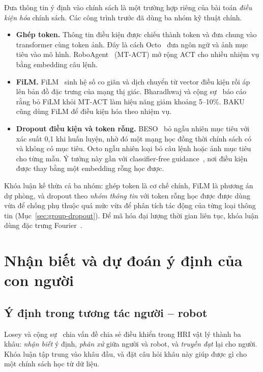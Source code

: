 Đưa thông tin ý định vào chính sách là một trường hợp riêng của bài toán \emph{điều kiện hóa} chính sách. Các công trình trước đã dùng ba nhóm kỹ thuật chính.
\begin{itemize}
  \item \textbf{Ghép token.} Thông tin điều kiện được chiếu thành token và đưa chung vào transformer cùng token ảnh. Đây là cách Octo~\cite{octo2024} đưa ngôn ngữ và ảnh mục tiêu vào mô hình. RoboAgent~\cite{bharadhwaj2024roboagent} (MT-ACT) mở rộng ACT cho nhiều nhiệm vụ bằng embedding câu lệnh.
  \item \textbf{FiLM.} FiLM~\cite{perez2018film} sinh hệ số co giãn và dịch chuyển từ vector điều kiện rồi áp lên bản đồ đặc trưng của mạng thị giác. Bharadhwaj và cộng sự~\cite{bharadhwaj2024roboagent} báo cáo rằng bỏ FiLM khỏi MT-ACT làm hiệu năng giảm khoảng 5--10\%. BAKU~\cite{haldar2024baku} cũng dùng FiLM để điều kiện hóa theo nhiệm vụ.
  \item \textbf{Dropout điều kiện và token rỗng.} BESO~\cite{reuss2023beso} bỏ ngẫu nhiên mục tiêu với xác suất 0,1 khi huấn luyện, nhờ đó một mạng học đồng thời chính sách có và không có mục tiêu. Octo ngẫu nhiên loại bỏ câu lệnh hoặc ảnh mục tiêu cho từng mẫu. Ý tưởng này gần với classifier-free guidance~\cite{ho2022cfg}, nơi điều kiện được thay bằng một embedding rỗng học được.
\end{itemize}

Khóa luận kế thừa cả ba nhóm: ghép token là cơ chế chính, FiLM là phương án dự phòng, và dropout theo \emph{nhóm thông tin} với token rỗng học được được dùng vừa để chống phụ thuộc quá mức vừa để phân tích tác động của từng loại thông tin (Mục~\ref{sec:group-dropout}). Để mã hóa đại lượng thời gian liên tục, khóa luận dùng đặc trưng Fourier~\cite{tancik2020fourier}.

\section{Nhận biết và dự đoán ý định của con người}
\label{sec:related-intent}

\subsection{Ý định trong tương tác người -- robot}

Losey và cộng sự~\cite{losey2018review} chia vấn đề chia sẻ điều khiển trong HRI vật lý thành ba khâu: \emph{nhận biết} ý định, \emph{phân xử} giữa người và robot, và \emph{truyền đạt} lại cho người. Khóa luận tập trung vào khâu đầu, và đặt câu hỏi khâu này giúp được gì cho một chính sách học từ dữ liệu.

